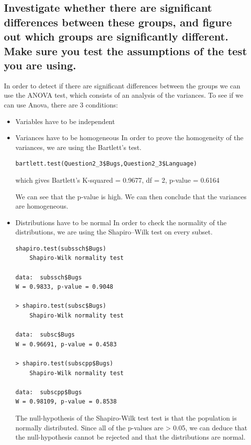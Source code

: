 \documentclass[12pt,a4paper]{scrartcl}
\begin{document}
\subsection{Investigate whether there are significant differences between these groups, and figure out which groups are significantly different. Make sure you test the assumptions of the test you are using.}
In order to detect if there are significant differences between the groups we can use the ANOVA test, which consists of an analysis of the variances.
To see if we can use Anova, there are 3 conditions:
\begin{itemize}
\item{Variables have to be independent}
\item{Variances have to be homogeneous}
In order to prove the homogeneity of the variances, we are using the Bartlett's test.
\begin{lstlisting}[frame=single]
bartlett.test(Question2_3$Bugs,Question2_3$Language)
\end{lstlisting}
which gives Bartlett's K-squared = 0.9677, df = 2, p-value = 0.6164 

We can see that the p-value is high. We can then conclude that the variances are homogeneous.
\item{Distributions have to be normal}
In order to check the normality of the distributions, we are using the Shapiro–Wilk test on every subset.
\begin{lstlisting}[frame=single]
shapiro.test(subssch$Bugs)
    Shapiro-Wilk normality test

data:  subssch$Bugs
W = 0.9833, p-value = 0.9048

> shapiro.test(subsc$Bugs)
    Shapiro-Wilk normality test

data:  subsc$Bugs
W = 0.96691, p-value = 0.4583

> shapiro.test(subscpp$Bugs)
    Shapiro-Wilk normality test

data:  subscpp$Bugs
W = 0.98109, p-value = 0.8538
\end{lstlisting}
The null-hypothesis of the Shapiro-Wilk test test is that the population is normally distributed.
Since all of the p-values are > 0.05, we can deduce that the null-hypothesis cannot be rejected and that the distributions are normal.
\end{itemize}
\end{document}
